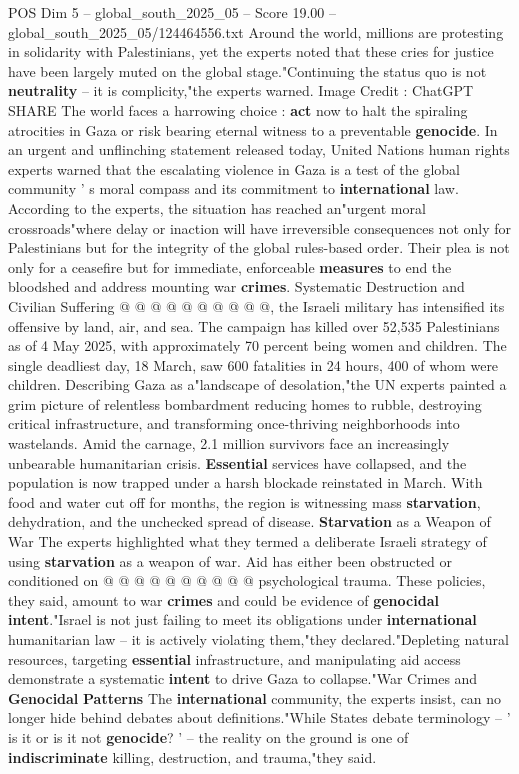 \begin{textsample}{POS Dim 5 – global\_south\_2025\_05 – Score 19.00 – global\_south\_2025\_05/124464556.txt}  \label{ex:f5_pos_114}
Around the world, millions are protesting in solidarity with Palestinians, yet the experts noted that these cries for justice have been largely muted on the global stage."Continuing the status quo is not \textbf{neutrality} -- it is complicity,"the experts warned.
Image Credit : ChatGPT SHARE The world faces a harrowing choice : \textbf{act} now to halt the spiraling atrocities in Gaza or risk bearing eternal witness to a preventable \textbf{genocide}.
In an urgent and unflinching statement released today, United Nations human rights experts warned that the escalating violence in Gaza is a test of the global community ' s moral compass and its commitment to \textbf{international} law.
According to the experts, the situation has reached an"urgent moral crossroads"where delay or inaction will have irreversible consequences not only for Palestinians but for the integrity of the global rules-based order.
Their plea is not only for a ceasefire but for immediate, enforceable \textbf{measures} to end the bloodshed and address mounting war \textbf{crimes}.
Systematic Destruction and Civilian Suffering @ @ @ @ @ @ @ @ @ @, the Israeli military has intensified its offensive by land, air, and sea.
The campaign has killed over 52,535 Palestinians as of 4 May 2025, with approximately 70 percent being women and children.
The single deadliest day, 18 March, saw 600 fatalities in 24 hours, 400 of whom were children.
Describing Gaza as a"landscape of desolation,"the UN experts painted a grim picture of relentless bombardment reducing homes to rubble, destroying critical infrastructure, and transforming once-thriving neighborhoods into wastelands.
Amid the carnage, 2.1 million survivors face an increasingly unbearable humanitarian crisis. \textbf{Essential} services have collapsed, and the population is now trapped under a harsh blockade reinstated in March.
With food and water cut off for months, the region is witnessing mass \textbf{starvation}, dehydration, and the unchecked spread of disease. \textbf{Starvation} as a Weapon of War The experts highlighted what they termed a deliberate Israeli strategy of using \textbf{starvation} as a weapon of war.
Aid has either been obstructed or conditioned on @ @ @ @ @ @ @ @ @ @ psychological trauma.
These policies, they said, amount to war \textbf{crimes} and could be evidence of \textbf{genocidal} \textbf{intent}."Israel is not just failing to meet its obligations under \textbf{international} humanitarian law -- it is actively violating them,"they declared."Depleting natural resources, targeting \textbf{essential} infrastructure, and manipulating aid access demonstrate a systematic \textbf{intent} to drive Gaza to collapse."War Crimes and \textbf{Genocidal} \textbf{Patterns} The \textbf{international} community, the experts insist, can no longer hide behind debates about definitions."While States debate terminology -- ' is it or is it not \textbf{genocide}? ' -- the reality on the ground is one of \textbf{indiscriminate} killing, destruction, and trauma,"they said.

\end{textsample}
